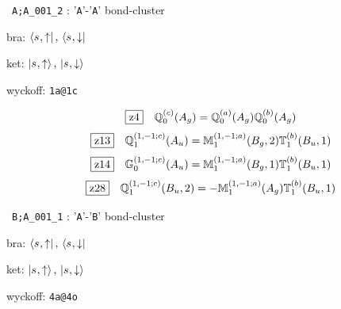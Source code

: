 \documentclass[fleqn,10pt,landscape]{jsarticle}
\begin{document}
\noindent\textbullet\, \texttt{A;A_001_2} : '\texttt{A}'-'\texttt{A}' bond-cluster

\noindent\quad * bra: $\bra{s_{},\uparrow},\, \bra{s_{},\downarrow}$

\noindent\quad * ket: $\ket{s_{},\uparrow},\, \ket{s_{},\downarrow}$

\noindent\quad * wyckoff: \texttt{1a@1c}

\begin{dmath*}
\hspace*{3mm}\fbox{z4}\quad \mathbb{Q}_{0}^{(c)}(A_{g})=\mathbb{Q}_{0}^{(a)}(A_{g}) \mathbb{Q}_{0}^{(b)}(A_{g})
\end{dmath*}
\begin{dmath*}
\hspace*{3mm}\fbox{z13}\quad \mathbb{Q}_{1}^{(1,-1;c)}(A_{u})=\mathbb{M}_{1}^{(1,-1;a)}(B_{g},2) \mathbb{T}_{1}^{(b)}(B_{u},1)
\end{dmath*}
\begin{dmath*}
\hspace*{3mm}\fbox{z14}\quad \mathbb{G}_{0}^{(1,-1;c)}(A_{u})=\mathbb{M}_{1}^{(1,-1;a)}(B_{g},1) \mathbb{T}_{1}^{(b)}(B_{u},1)
\end{dmath*}
\begin{dmath*}
\hspace*{3mm}\fbox{z28}\quad \mathbb{Q}_{1}^{(1,-1;c)}(B_{u},2)=- \mathbb{M}_{1}^{(1,-1;a)}(A_{g}) \mathbb{T}_{1}^{(b)}(B_{u},1)
\end{dmath*}
\vspace{5mm}

\noindent\textbullet\, \texttt{B;A_001_1} : '\texttt{A}'-'\texttt{B}' bond-cluster

\noindent\quad * bra: $\bra{s_{},\uparrow},\, \bra{s_{},\downarrow}$

\noindent\quad * ket: $\ket{s_{},\uparrow},\, \ket{s_{},\downarrow}$

\noindent\quad * wyckoff: \texttt{4a@4o}
\end{document}
